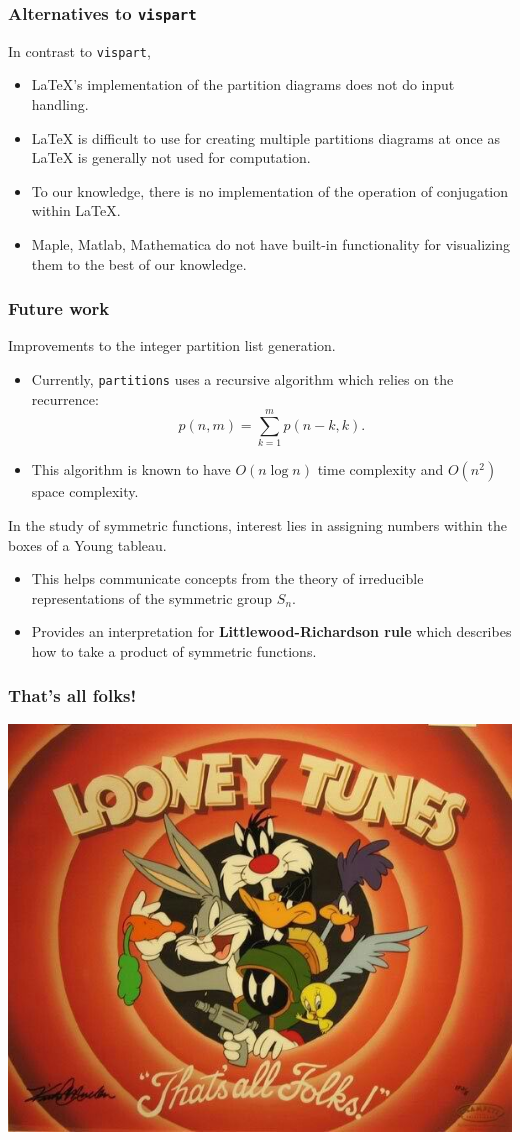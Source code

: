 \documentclass{beamer}
\begin{document}
\begin{frame}
\frametitle{Alternatives to \texttt{vispart}}

In contrast to \texttt{vispart},
\begin{itemize}
	\item LaTeX's implementation of the partition diagrams does not do input handling.
	\item LaTeX is difficult to use for creating multiple partitions diagrams at once as LaTeX is generally not used for computation.
	\item To our knowledge, there is no implementation of the operation of conjugation within LaTeX.
	\item Maple, Matlab, Mathematica do not have built-in functionality for visualizing them to the best of our knowledge.
\end{itemize}
\end{frame}


\begin{frame}
\frametitle{Future work}	

Improvements to the integer partition list generation.
\begin{itemize}
	\item Currently, \texttt{partitions} uses a recursive algorithm which relies on the recurrence:
	$$p(n,m) = \sum_{k=1}^{m}p(n-k, k).$$
	\item This algorithm is known to have $O(n\log n)$ time complexity and $O(n^2)$ space complexity.
\end{itemize}
\end{frame}

\begin{frame}
	In the study of symmetric functions, interest lies in assigning numbers within the boxes of a Young tableau.

\begin{itemize}
\frametitle{Future work - math}
\item This helps communicate concepts from the theory of irreducible representations of the symmetric group $S_n$.
\item Provides an interpretation for \textbf{Littlewood-Richardson rule} which describes how to take a product of symmetric functions.
\end{itemize}
\end{frame}




\begin{frame}
	\frametitle{That's all folks!}
	\centering
\includegraphics[scale = 0.4]{LooneyTunes}
\end{frame}
\end{document}
